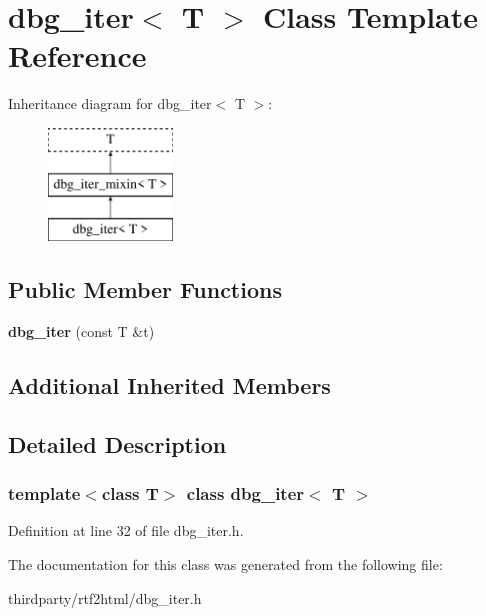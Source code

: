 \hypertarget{classdbg__iter}{}\section{dbg\+\_\+iter$<$ T $>$ Class Template Reference}
\label{classdbg__iter}
Inheritance diagram for dbg\+\_\+iter$<$ T $>$\+:\begin{figure}[H]
\begin{center}
\leavevmode
\includegraphics[height=3.000000cm]{classdbg__iter}
\end{center}
\end{figure}
\subsection*{Public Member Functions}
\begin{DoxyCompactItemize}
\item 
\mbox{\label{classdbg__iter_abf09b530ac66d47162871b5c1baa6262}} 
{\bfseries dbg\+\_\+iter} (const T \&t)
\end{DoxyCompactItemize}
\subsection*{Additional Inherited Members}


\subsection{Detailed Description}
\subsubsection*{template$<$class T$>$\newline
class dbg\+\_\+iter$<$ T $>$}



Definition at line 32 of file dbg\+\_\+iter.\+h.



The documentation for this class was generated from the following file\+:\begin{DoxyCompactItemize}
\item 
thirdparty/rtf2html/dbg\+\_\+iter.\+h\end{DoxyCompactItemize}
